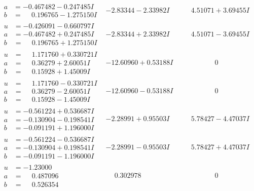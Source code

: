 \documentclass[1p]{elsarticle_modified}
\theoremstyle{definition}
\begin{document}
$$\begin{array}{c|c|c}
\begin{aligned}
a &= -0.467482 - 0.247485 I \\
b &= \phantom{-}0.196765 - 1.275150 I\end{aligned}
 & -2.83344 - 2.33982 I & \phantom{-}4.51071 + 3.69455 I \\ \hline\begin{aligned}
u &= -0.426091 - 0.660797 I \\
a &= -0.467482 + 0.247485 I \\
b &= \phantom{-}0.196765 + 1.275150 I\end{aligned}
 & -2.83344 + 2.33982 I & \phantom{-}4.51071 - 3.69455 I \\ \hline\begin{aligned}
u &= \phantom{-}1.171760 + 0.330721 I \\
a &= \phantom{-}0.36279 + 2.60051 I \\
b &= \phantom{-}0.15928 + 1.45009 I\end{aligned}
 & -12.60960 + 0.53188 I & \phantom{-0.000000 } 0 \\ \hline\begin{aligned}
u &= \phantom{-}1.171760 - 0.330721 I \\
a &= \phantom{-}0.36279 - 2.60051 I \\
b &= \phantom{-}0.15928 - 1.45009 I\end{aligned}
 & -12.60960 - 0.53188 I & \phantom{-0.000000 } 0 \\ \hline\begin{aligned}
u &= -0.561224 + 0.536687 I \\
a &= -0.130904 - 0.198541 I \\
b &= -0.091191 + 1.196000 I\end{aligned}
 & -2.28991 + 0.95503 I & \phantom{-}5.78427 - 4.47037 I \\ \hline\begin{aligned}
u &= -0.561224 - 0.536687 I \\
a &= -0.130904 + 0.198541 I \\
b &= -0.091191 - 1.196000 I\end{aligned}
 & -2.28991 - 0.95503 I & \phantom{-}5.78427 + 4.47037 I \\ \hline\begin{aligned}
u &= -1.23000\phantom{ +0.000000I} \\
a &= \phantom{-}0.487096\phantom{ +0.000000I} \\
b &= \phantom{-}0.526354\phantom{ +0.000000I}\end{aligned}
 & \phantom{-}0.302978\phantom{ +0.000000I} & \phantom{-0.000000 } 0 \\ \hline\begin{aligned}

\end{aligned}
\end{array}$$
\end{document}
